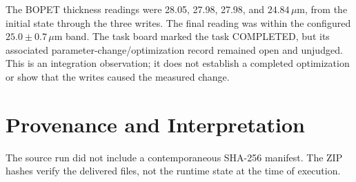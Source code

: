 \documentclass[journal]{IEEEtran}
\begin{document}
The BOPET thickness readings were 28.05, 27.98, 27.98, and
$24.84\,\mu\mathrm{m}$, from the initial state through the three writes. The
final reading was within the configured $25.0\pm0.7\,\mu\mathrm{m}$ band.
The task board marked the task COMPLETED, but its associated
parameter-change/optimization record remained open and unjudged. This is an
integration observation; it does not establish a completed optimization or
show that the writes caused the measured change.

\section{Provenance and Interpretation}
The source run did not include a contemporaneous SHA-256 manifest. The ZIP
hashes verify the delivered files, not the runtime state at the time of
execution.
\end{document}
